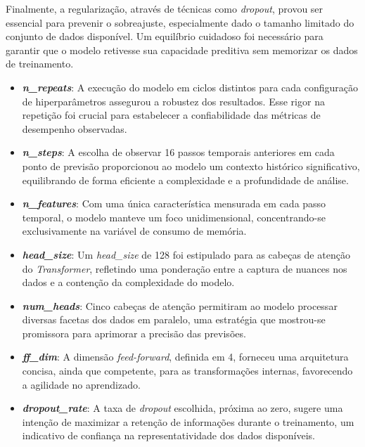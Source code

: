Finalmente, a regularização, através de técnicas como \textit{dropout}, provou ser essencial para prevenir o sobreajuste, especialmente dado o tamanho limitado do conjunto de dados disponível. Um equilíbrio cuidadoso foi necessário para garantir que o modelo retivesse sua capacidade preditiva sem memorizar os dados de treinamento.

\begin{itemize}
\item \textbf{\textit{n\_repeats}}: A execução do modelo em ciclos distintos para cada configuração de hiperparâmetros assegurou a robustez dos resultados. Esse rigor na repetição foi crucial para estabelecer a confiabilidade das métricas de desempenho observadas.

\item \textbf{\textit{n\_steps}}: A escolha de observar 16 passos temporais anteriores em cada ponto de previsão proporcionou ao modelo um contexto histórico significativo, equilibrando de forma eficiente a complexidade e a profundidade de análise.

\item \textbf{\textit{n\_features}}: Com uma única característica mensurada em cada passo temporal, o modelo manteve um foco unidimensional, concentrando-se exclusivamente na variável de consumo de memória.

\item \textbf{\textit{head\_size}}: Um \textit{head\_size} de 128 foi estipulado para as cabeças de atenção do \textit{Transformer}, refletindo uma ponderação entre a captura de nuances nos dados e a contenção da complexidade do modelo.

\item \textbf{\textit{num\_heads}}: Cinco cabeças de atenção permitiram ao modelo processar diversas facetas dos dados em paralelo, uma estratégia que mostrou-se promissora para aprimorar a precisão das previsões.

\item \textbf{\textit{ff\_dim}}: A dimensão \textit{feed-forward}, definida em 4, forneceu uma arquitetura concisa, ainda que competente, para as transformações internas, favorecendo a agilidade no aprendizado.

\item \textbf{\textit{dropout\_rate}}: A taxa de \textit{dropout} escolhida, próxima ao zero, sugere uma intenção de maximizar a retenção de informações durante o treinamento, um indicativo de confiança na representatividade dos dados disponíveis.


\end{itemize}
